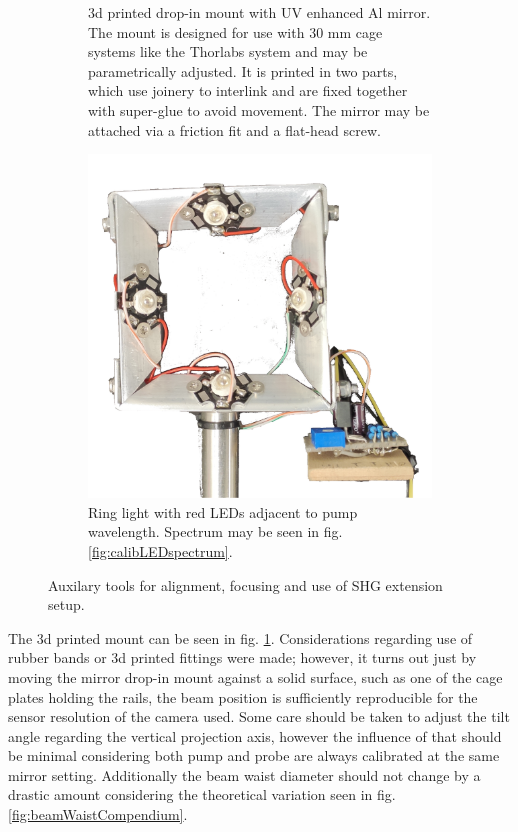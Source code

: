 \documentclass[twoside,openright,listof=numbered]{scrreprt}
\begin{document}
\begin{figure}[hbtp]
\begin{subfigure}[t]{0.66\textwidth}
\begin{subfigure}[t]{0.45\columnwidth}
\end{subfigure}
\caption{3d printed drop-in mount with UV enhanced Al mirror.
The mount is designed for use with 30 mm cage systems like the Thorlabs system and may be parametrically adjusted.
It is printed in two parts, which use joinery to interlink and are fixed together with super-glue to avoid movement.
The mirror may be attached via a friction fit and a flat-head screw.\label{fig:drop-in-Mirror-mount}}
\end{subfigure}
\hfill
\centering
\begin{subfigure}[t]{0.3\textwidth}
\centering
\includegraphics[width=\columnwidth]{images/TAM/RingLightFrontFree.png}
\caption{Ring light with red LEDs adjacent to pump wavelength. Spectrum may be seen in fig. \ref{fig:calibLEDspectrum}.\label{fig:ringLight}}
\end{subfigure}
\caption{Auxilary tools for alignment, focusing and use of SHG extension setup.}
\end{figure}


The 3d printed mount can be seen in fig. \ref{fig:drop-in-Mirror-mount}.
Considerations regarding use of rubber bands or 3d printed fittings were made; however, it turns out just by moving the mirror drop-in mount against a solid surface, such as one of the cage plates holding the rails, the beam position is sufficiently reproducible for the sensor resolution of the camera used. Some care should be taken to adjust the tilt angle regarding the vertical projection axis, however the influence of that should be minimal considering both pump and probe are always calibrated at the same mirror setting. Additionally the beam waist diameter should not change by a drastic amount considering the theoretical variation seen in fig. \ref{fig:beamWaistCompendium}.\\
\end{document}
